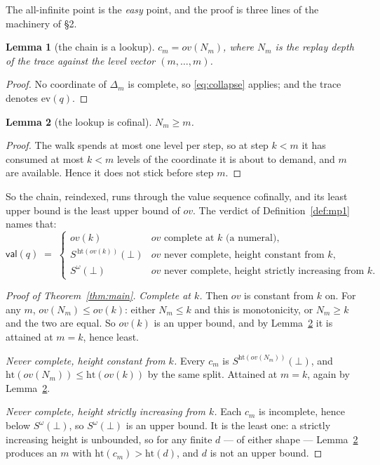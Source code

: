 \documentclass[11pt]{article}
\newcommand{\ev}{\mathrm{ev}}
\newcommand{\val}{\mathsf{val}}
\newcommand{\Sw}{S^{\omega}(\bot)}
\newcommand{\hgt}{\mathrm{ht}}
\newcommand{\ovv}{\mathit{ov}}
\newtheorem{lemma}{Lemma}
\theoremstyle{definition}
\begin{document}
The all-infinite point is the \emph{easy} point, and the proof is three
lines of the machinery of \S2.

\begin{lemma}[the chain is a lookup]
\label{lem:lookup}
$c_m = \ovv(N_m)$, where $N_m$ is the replay depth of the trace against
the level vector $(m,\dots,m)$.
\end{lemma}

\begin{proof}
No coordinate of $\Delta_m$ is complete, so \eqref{eq:collapse} applies;
and the trace denotes $\ev(q)$.
\end{proof}

\begin{lemma}[the lookup is cofinal]
\label{lem:cofinal}
$N_m \ge m$.
\end{lemma}

\begin{proof}
The walk spends at most one level per step, so at step $k < m$ it has
consumed at most $k < m$ levels of the coordinate it is about to demand,
and $m$ are available. Hence it does not stick before step $m$.
\end{proof}

So the chain, reindexed, runs through the value sequence cofinally, and
its least upper bound is the least upper bound of $\ovv$. The verdict of
Definition~\ref{def:mp1} names that:
\[
\val(q) \;=\;
\begin{cases}
\ovv(k) & \text{$\ovv$ complete at $k$ (a numeral),}\\
S^{\,\hgt(\ovv(k))}(\bot) & \text{$\ovv$ never complete, height constant from $k$,}\\
\Sw & \text{$\ovv$ never complete, height strictly increasing from $k$.}
\end{cases}
\]

\begin{proof}[Proof of Theorem~\ref{thm:main}]
\emph{Complete at $k$.} Then $\ovv$ is constant from $k$ on. For any $m$,
$\ovv(N_m) \le \ovv(k)$: either $N_m \le k$ and this is monotonicity, or
$N_m \ge k$ and the two are equal. So $\ovv(k)$ is an upper bound, and by
Lemma~\ref{lem:cofinal} it is attained at $m = k$, hence least.

\emph{Never complete, height constant from $k$.} Every $c_m$ is
$S^{\hgt(\ovv(N_m))}(\bot)$, and $\hgt(\ovv(N_m)) \le \hgt(\ovv(k))$ by the
same split. Attained at $m=k$, again by Lemma~\ref{lem:cofinal}.

\emph{Never complete, height strictly increasing from $k$.} Each $c_m$ is
incomplete, hence below $\Sw$, so $\Sw$ is an upper bound. It is the least
one: a strictly increasing height is unbounded, so for any finite $d$ ---
of either shape --- Lemma~\ref{lem:cofinal} produces an $m$ with
$\hgt(c_m) > \hgt(d)$, and $d$ is not an upper bound.
\end{proof}
\end{document}
